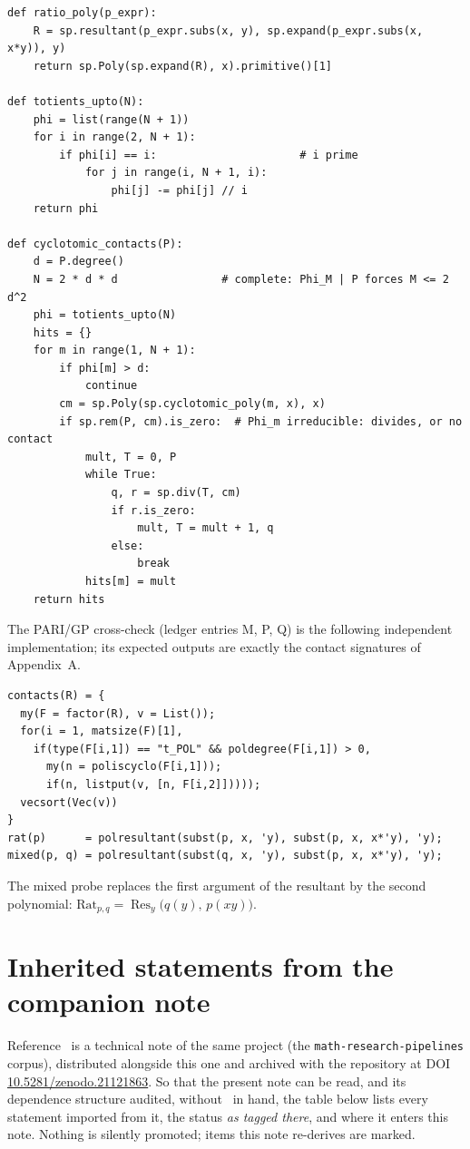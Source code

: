 \documentclass[11pt]{article}
\theoremstyle{plain}
\theoremstyle{definition}
\theoremstyle{remark}
\newcommand{\Rat}{\mathrm{Rat}}
\DeclareMathOperator{\Res}{Res}
\begin{document}
\begin{verbatim}
def ratio_poly(p_expr):
    R = sp.resultant(p_expr.subs(x, y), sp.expand(p_expr.subs(x, x*y)), y)
    return sp.Poly(sp.expand(R), x).primitive()[1]

def totients_upto(N):
    phi = list(range(N + 1))
    for i in range(2, N + 1):
        if phi[i] == i:                      # i prime
            for j in range(i, N + 1, i):
                phi[j] -= phi[j] // i
    return phi

def cyclotomic_contacts(P):
    d = P.degree()
    N = 2 * d * d                # complete: Phi_M | P forces M <= 2 d^2
    phi = totients_upto(N)
    hits = {}
    for m in range(1, N + 1):
        if phi[m] > d:
            continue
        cm = sp.Poly(sp.cyclotomic_poly(m, x), x)
        if sp.rem(P, cm).is_zero:  # Phi_m irreducible: divides, or no contact
            mult, T = 0, P
            while True:
                q, r = sp.div(T, cm)
                if r.is_zero:
                    mult, T = mult + 1, q
                else:
                    break
            hits[m] = mult
    return hits
\end{verbatim}

\noindent The PARI/GP cross-check (ledger entries M, P, Q) is the following
independent implementation; its expected outputs are exactly the contact
signatures of Appendix~A.

\begin{verbatim}
contacts(R) = {
  my(F = factor(R), v = List());
  for(i = 1, matsize(F)[1],
    if(type(F[i,1]) == "t_POL" && poldegree(F[i,1]) > 0,
      my(n = poliscyclo(F[i,1]));
      if(n, listput(v, [n, F[i,2]]))));
  vecsort(Vec(v))
}
rat(p)      = polresultant(subst(p, x, 'y), subst(p, x, x*'y), 'y);
mixed(p, q) = polresultant(subst(q, x, 'y), subst(p, x, x*'y), 'y);
\end{verbatim}

\noindent The mixed probe replaces the first argument of the resultant by the
second polynomial: $\Rat_{p,q}=\Res_y\bigl(q(y),\,p(xy)\bigr)$.

\section{Inherited statements from the companion note}\label{app:inherited}

Reference~\cite{CMC} is a technical note of the same project
(the \texttt{math-research-pipelines} corpus), distributed alongside this
one and archived with the repository at DOI
\url{10.5281/zenodo.21121863}. So that the present note can be
read, and its dependence structure audited, without~\cite{CMC} in hand, the
table below lists every
statement imported from it, the status \emph{as tagged there}, and where it
enters this note. Nothing is silently promoted; items this note re-derives
are marked.
\end{document}
